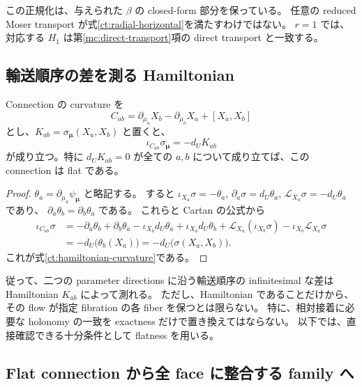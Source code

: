 この正規化は、与えられた $\beta$ の closed-form 部分を保っている。
任意の reduced Moser transport が式\eqref{ct:radial-horizontal}を満たすわけではない。
$r=1$ では、対応する $H_1$ は第\ref{mc:direct-transport}項の direct transport と一致する。

\subsection{輸送順序の差を測る Hamiltonian}
\label{ct:curvature}

\begin{proposition}
\label{ct:curvature-formula}
Connection の curvature を
\[
 C_{ab}=\partial_{\mu_a}X_b-\partial_{\mu_b}X_a+[X_a,X_b]
\]
とし、$K_{ab}=\sigma_{\boldsymbol\mu}(X_a,X_b)$ と置くと、
\begin{equation}\label{ct:hamiltonian-curvature}
 \iota_{C_{ab}}\sigma_{\boldsymbol\mu}=-d_UK_{ab}
\end{equation}
が成り立つ。特に $d_UK_{ab}=0$ が全ての $a,b$ について成り立てば、この connection は flat である。
\end{proposition}

\begin{proof}
$\theta_a=\partial_{\mu_a}\psi_{\boldsymbol\mu}$ と略記する。
すると $\iota_{X_a}\sigma=-\theta_a$,
$\partial_a\sigma=d_U\theta_a$,
$\mathcal L_{X_a}\sigma=-d_U\theta_a$ であり、
$\partial_a\theta_b=\partial_b\theta_a$ である。
これらと Cartan の公式から
\begin{align*}
 \iota_{C_{ab}}\sigma
 &=-\partial_a\theta_b+\partial_b\theta_a
   -\iota_{X_b}d_U\theta_a+\iota_{X_a}d_U\theta_b
   +\mathcal L_{X_a}(\iota_{X_b}\sigma)
   -\iota_{X_b}\mathcal L_{X_a}\sigma\\
 &=-d_U\bigl(\theta_b(X_a)\bigr)
  =-d_U\bigl(\sigma(X_a,X_b)\bigr).
\end{align*}
これが式\eqref{ct:hamiltonian-curvature}である。
\end{proof}

従って、二つの parameter directions に沿う輸送順序の infinitesimal な差は
Hamiltonian $K_{ab}$ によって測れる。
ただし、Hamiltonian であることだけから、その flow が指定 fibration の各 fiber を保つとは限らない。
特に、相対接着に必要な holonomy の一致を exactness だけで置き換えてはならない。
以下では、直接確認できる十分条件として flatness を用いる。

\subsection{Flat connection から全 face に整合する family へ}
\label{ct:family}

